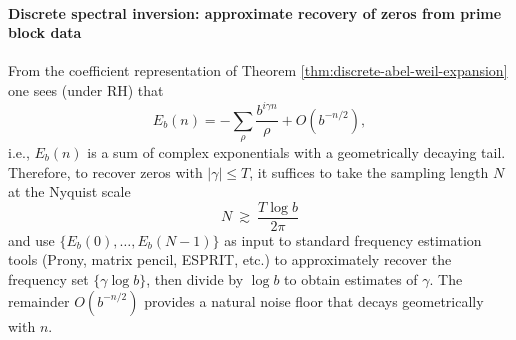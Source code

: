 \paragraph{Discrete spectral inversion: approximate recovery of zeros from prime block data}
From the coefficient representation of Theorem \ref{thm:discrete-abel-weil-expansion} one sees (under RH) that
\[
E_b(n)=-\sum_{\rho}\frac{b^{i\gamma n}}{\rho}+O(b^{-n/2}),
\]
i.e., \(E_b(n)\) is a sum of complex exponentials with a geometrically decaying tail. Therefore, to recover zeros with \(|\gamma|\le T\), it suffices to take the sampling length \(N\) at the Nyquist scale
\[
N\ \gtrsim\ \frac{T\log b}{2\pi}
\]
and use \(\{E_b(0),\dots,E_b(N-1)\}\) as input to standard frequency estimation tools (Prony, matrix pencil, ESPRIT, etc.) to approximately recover the frequency set \(\{\gamma\log b\}\), then divide by \(\log b\) to obtain estimates of \(\gamma\). The remainder \(O(b^{-n/2})\) provides a natural noise floor that decays geometrically with \(n\).

\endinput
